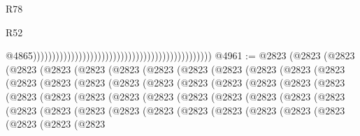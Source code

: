 \begin{lexlean}{R78}
\begin{lexlean}{R52}
\begin{coremodule}
{{{{{{{{{{{{{{{{{{{{{{{{{{{{{{{{{{{{{{{{{{{{{{{{{{{{{{{{{{{{{{{{{{{{{{{{{{{{{{{{{{{{{{{{{{{{{{{{{{{{{{{{{{{{{{{{{{{{{{{{{{{{{{{{{{{{{{{{{{{{{{{{{{{{{{{{{{{{{{{{{{{{{{{{{{{{{{{{{{{{{{{{{{{{{{{{{{{{{{                                                                                                  @4865)))))))))))))))))))))))))))))))))))))))))))))))
@4961 := @2823
    (@2823
      (@2823
        (@2823
          (@2823
            (@2823
              (@2823
                (@2823
                  (@2823
                    (@2823
                      (@2823
                        (@2823
                          (@2823
                            (@2823
                              (@2823
                                (@2823
                                  (@2823
                                    (@2823
                                      (@2823
                                        (@2823
                                          (@2823
                                            (@2823
                                              (@2823
                                                (@2823
                                                  (@2823
                                                    (@2823
                                                      (@2823
                                                        (@2823
                                                          (@2823
                                                            (@2823
                                                              (@2823
                                                                (@2823
                                                                  (@2823
                                                                    (@2823
                                                                      (@2823
                                                                        (@2823
                                                                          (@2823
                                                                            (@2823
                                                                              (@2823
                                                                                (@2823
                                                                                  (@2823
                                                                                    (@2823
                                                                                      (@2823
                                                                                        (@2823
                                                                                          (@2823
                                                                                            (@2823
}}}}}}}}}}}}}}}}}}}}}}}}}}}}}}}}}}}}}}}}}}}}}}}}}}}}}}}}}}}}}}}}}}}}}}}}}}}}}}}}}}}}}}}}}}}}}}}}}}}}}}}}}}}}}}}}}}}}}}}}}}}}}}}}}}}}}}}}}}}}}}}}}}}}}}}}}}}}}}}}}}}}}}}}}}}}}}}}}}}}}}}}}}}}}}}}}}}}}}
\end{coremodule}
\end{lexlean}
\end{lexlean}
